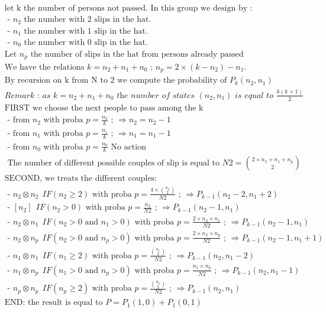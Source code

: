 \documentclass[10pt,a4paper]{letter}
\begin{document}
\begin{align*}
	&\text{let k the number of persons not passed. In this group we design by :}\\
	&\text{  - }n_{2} \text{ the number with 2 slips in the hat.}\\
	&\text{  - }n_{1} \text{ the number with 1 slip in the hat.}\\ 	
	&\text{  - }n_{0} \text{ the number with 0 slip in the hat.}\\
	&\text{Let }n_{p}\text{ the number of slips in the hat from persons already passed}\\
	&\text {We have the relations }k=n_{2}+n_{1}+n_{0}\text{ ; }  n_{p}=2\times (k-n_{2})-n_{1}.\\
	&\text{By recursion on k from N to 2 we compute the probability of }P_{k}(n_{2},n_{1})\\
	&\textit{Remark : as }k=n_{2}+n_{1}+n_{0}\textit{ the number of states }(n_{2},n_{1})
      \textit{ is equal to }\frac{k(k+1)}{2}\\
    &\text{FIRST we choose the next people to pass among the k}\\
	&\text{  - from }n_{2} \text{ with proba }p=\frac{n_{2}}{k}\text{ ; }\Rightarrow n_{2}=n_{2}-1\\
	&\text{  - from }n_{1} \text{ with proba }p=\frac{n_{1}}{k}\text{ ; }\Rightarrow n_{1}=n_{1}-1\\
	&\text{  - from }n_{0} \text{ with proba }p=\frac{n_{0}}{k}\text{ No action }\\
	&\text{  The number of different possible couples of slip is equal to } N2=\binom{2\times n_{2}+n_{1}+n_{p}}{2}\\
	&\text{SECOND, we treats the different couples: }\\
	&\text{ - }n_{2}\otimes n_{2}\ \ IF(n_{2}\geq2)\text{ with proba }p=\frac{4\times\binom{ n_{2}}{2}}{N2}\text{ ; }\Rightarrow P_{k-1}(n_{2}-2,n_{1}+2)\\
	&\text{ - }[n_{2}]\ \ IF(n_{2}>0)\text{ with proba }p=\frac{n_{2}}{N2}\text{ ; }\Rightarrow P_{k-1}(n_{2}-1,n_{1})\\
	&\text{ - }n_{2}\otimes n_{1}\ \ IF(n_{2}>0\text{ and }n_{1}>0)\text{ with proba }p=\frac{2\times n_{2}\times n_{1}}{N2}\text{ ; }\Rightarrow P_{k-1}(n_{2}-1,n_{1})\\
	&\text{ - }n_{2}\otimes n_{p}\ \ IF(n_{2}>0\text{ and }n_{p}>0)\text{ with proba }p=\frac{2\times n_{2}\times n_{p}}{N2}\text{ ; }\Rightarrow P_{k-1}(n_{2}-1,n_{1}+1)\\
	&\text{ - }n_{1}\otimes n_{1}\ \ IF(n_{1}\geq2)\text{ with proba }p=\frac{\binom{ n_{1}}{2}}{N2}\text{ ; }\Rightarrow P_{k-1}(n_{2},n_{1}-2)\\
	&\text{ - }n_{1}\otimes n_{p}\ \ IF(n_{1}>0\text{ and }n_{p}>0)\text{ with proba }p=\frac{n_{1}\times n_{p}}{N2}\text{ ; }\Rightarrow P_{k-1}(n_{2},n_{1}-1)\\
	&\text{ - }n_{p}\otimes n_{p}\ \ IF(n_{p}\geq2)\text{ with proba }p=\frac{\binom{ n_{p}}{2}}{N2}\text{ ; }\Rightarrow P_{k-1}(n_{2},n_{1})\\
	&\text{END: the result is equal to } P=P_{1}(1,0)+P_{1}(0,1) 		
\end{align*}
\end{document}
